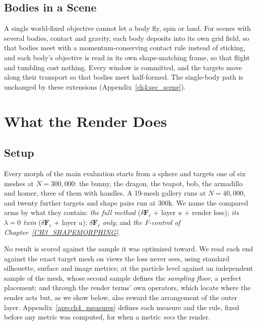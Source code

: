 \subsection{Bodies in a Scene}
A single world-fixed objective cannot let a body fly, spin or land. For scenes with several bodies, contact and gravity,
each body deposits into its own grid field, so that bodies meet with a momentum-conserving contact rule instead of
sticking, and each body's objective is read in its own shape-matching frame, so that flight and tumbling cost nothing.
Every window is committed, and the targets move along their transport so that bodies meet half-formed. The single-body
path is unchanged by these extensions (Appendix~\ref{ch4:sec_scene}).

\section{What the Render Does}
\label{ch4:sec_render}

\subsection{Setup}
\label{ch4:sec_protocol}
Every morph of the main evaluation starts from a sphere and targets one of six meshes at $N=300{,}000$: the bunny, the
dragon, the teapot, bob, the armadillo and homer, three of them with handles. A 19-mesh gallery runs at $N=40{,}000$, and
twenty further targets and shape pairs run at 300k. We name the compared arms by what they contain: \emph{the full method}
($\delta\mathbf{F}_c$ + layer $u$ + render loss); \emph{its $\lambda=0$ twin} ($\delta\mathbf{F}_c$ + layer $u$);
\emph{$\delta\mathbf{F}_c$ only}; and \emph{the F-control of Chapter~\ref{CH3_SHAPEMORPHING}}.

No result is scored against the sample it was optimized toward. We read each end against the exact target mesh on views
the loss never sees, using standard silhouette, surface and image metrics; at the particle level against an independent
sample of the mesh, whose second sample defines the \emph{sampling floor}, a perfect placement; and through the render
terms' own operators, which locate where the render acts but, as we show below, also reward the arrangement of the outer
layer. Appendix~\ref{app:ch4_measures} defines each measure and the rule, fixed before any metric was computed, for when a
metric \emph{sees} the render.

